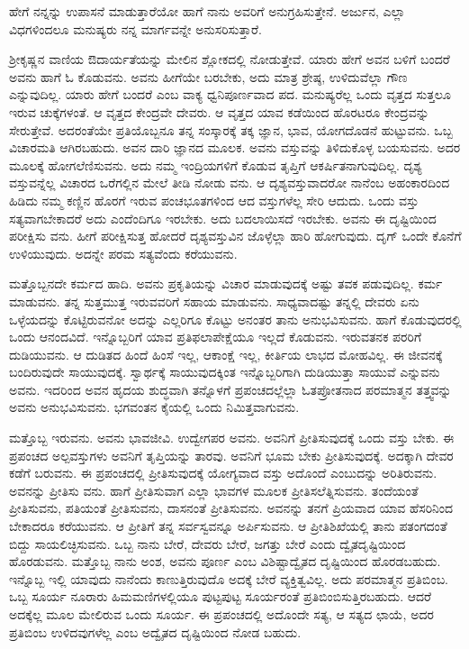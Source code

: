 {\small ಹೇಗೆ ನನ್ನನ್ನು ಉಪಾಸನೆ ಮಾಡುತ್ತಾರೆಯೋ ಹಾಗೆ ನಾನು ಅವರಿಗೆ ಅನುಗ್ರಹಿಸುತ್ತೇನೆ. ಅರ್ಜುನ, ಎಲ್ಲಾ ವಿಧಗಳಿಂದಲೂ ಮನುಷ್ಯರು ನನ್ನ ಮಾರ್ಗವನ್ನೇ ಅನುಸರಿಸುತ್ತಾರೆ.}

ಶ‍್ರೀಕೃಷ್ಣನ ವಾಣಿಯ ಔದಾರ್ಯತೆಯನ್ನು ಮೇಲಿನ ಶ್ಲೋಕದಲ್ಲಿ ನೋಡುತ್ತೇವೆ. ಯಾರು ಹೇಗೆ ಅವನ ಬಳಿಗೆ ಬಂದರೆ ಅವನು ಹಾಗೆ ಓ ಕೊಡುವನು. ಅವನು ಹೀಗೆಯೇ ಬರಬೇಕು, ಅದು ಮಾತ್ರ ಶ್ರೇಷ್ಠ, ಉಳಿದುವೆಲ್ಲಾ ಗೌಣ ಎನ್ನುವುದಿಲ್ಲ. ಯಾರು ಹೇಗೆ ಬಂದರೆ ಎಂಬ ವಾಕ್ಯ ಧ್ವನಿಪೂರ್ಣವಾದ ಪದ. ಮನುಷ್ಯರೆಲ್ಲ ಒಂದು ವೃತ್ತದ ಸುತ್ತಲೂ ಇರುವ ಚುಕ್ಕೆಗಳಂತೆ. ಆ ವೃತ್ತದ ಕೇಂದ್ರವೇ ದೇವರು. ಆ ವೃತ್ತದ ಯಾವ ಕಡೆಯಿಂದ ಹೊರಟರೂ ಕೇಂದ್ರವನ್ನು ಸೇರುತ್ತೇವೆ. ಅದರಂತೆಯೇ ಪ್ರತಿಯೊಬ್ಬನೂ ತನ್ನ ಸಂಸ್ಕಾರಕ್ಕೆ ತಕ್ಕ ಜ್ಞಾನ, ಭಾವ, ಯೋಗದೊಡನೆ ಹುಟ್ಟುವನು. ಒಬ್ಬ ವಿಚಾರಮತಿ ಆಗಿರಬಹುದು. ಅವನ ದಾರಿ ಜ್ಞಾನದ ಮೂಲಕ. ಅವನು ವಸ್ತುವನ್ನು ತಿಳಿದುಕೊಳ್ಳ ಬಯಸುವನು. ಅದರ ಮೂಲಕ್ಕೆ ಹೋಗಲೆಣಿಸುವನು. ಅದು ನಮ್ಮ ಇಂದ್ರಿಯಗಳಿಗೆ ಕೊಡುವ ತೃಪ್ತಿಗೆ ಆಕರ್ಷಿತನಾಗುವುದಿಲ್ಲ. ದೃಶ್ಯ ವಸ್ತುವನ್ನೆಲ್ಲ ವಿಚಾರದ ಒರೆಗಲ್ಲಿನ ಮೇಲೆ ತೀಡಿ ನೋಡು ವನು. ಆ ದೃಶ್ಯವಸ್ತುವಾದರೋ ನಾನೆಂಬ ಅಹಂಕಾರದಿಂದ ಹಿಡಿದು ನಮ್ಮ ಕಣ್ಣಿನ ಹೊರಗೆ ಇರುವ ಪಂಚಭೂತಗಳಿಂದ ಆದ ವಸ್ತುಗಳೆಲ್ಲ ಸೇರಿ ಆದುದು. ಒಂದು ವಸ್ತು ಸತ್ಯವಾಗಬೇಕಾದರೆ ಅದು ಎಂದೆಂದಿಗೂ ಇರಬೇಕು. ಅದು ಬದಲಾಯಿಸದೆ ಇರಬೇಕು. ಅವನು ಈ ದೃಷ್ಟಿಯಿಂದ ಪರೀಕ್ಷಿಸು ವನು. ಹೀಗೆ ಪರೀಕ್ಷಿಸುತ್ತ ಹೋದರೆ ದೃಶ್ಯವಸ್ತುವಿನ ಜೊಳ್ಳೆಲ್ಲಾ ಹಾರಿ ಹೋಗುವುದು. ದೃಗ್ ಒಂದೇ ಕೊನೆಗೆ ಉಳಿಯುವುದು. ಅದನ್ನೇ ಪರಮ ಸತ್ಯವೆಂದು ಕರೆಯುವನು.

ಮತ್ತೊಬ್ಬನದೇ ಕರ್ಮದ ಹಾದಿ. ಅವನು ಪ್ರಕೃತಿಯನ್ನು ವಿಚಾರ ಮಾಡುವುದಕ್ಕೆ ಅಷ್ಟು ತವಕ ಪಡುವುದಿಲ್ಲ. ಕರ್ಮ ಮಾಡುವನು. ತನ್ನ ಸುತ್ತಮುತ್ತ ಇರುವವರಿಗೆ ಸಹಾಯ ಮಾಡುವನು. ಸಾಧ್ಯವಾದಷ್ಟು ತನ್ನಲ್ಲಿ ದೇವರು ಏನು ಒಳ್ಳೆಯದನ್ನು ಕೊಟ್ಟಿರುವನೋ ಅದನ್ನು ಎಲ್ಲರಿಗೂ ಕೊಟ್ಟು ಅನಂತರ ತಾನು ಅನುಭವಿಸುವನು. ಹಾಗೆ ಕೊಡುವುದರಲ್ಲಿ ಒಂದು ಆನಂದವಿದೆ. ಇನ್ನೊಬ್ಬರಿಗೆ ಯಾವ ಪ್ರತಿಫಲಾಪೇಕ್ಷೆಯೂ ಇಲ್ಲದೆ ಕೊಡುವನು. ಇರುವತನಕ ಪರರಿಗೆ ದುಡಿಯುವನು. ಆ ದುಡಿತದ ಹಿಂದೆ ಹಿಂಸೆ ಇಲ್ಲ, ಆಕಾಂಕ್ಷೆ ಇಲ್ಲ, ಕೀರ್ತಿಯ ಲಾಭದ ಮೋಹವಿಲ್ಲ. ಈ ಜೀವನಕ್ಕೆ ಬಂದಿರುವುದೇ ಸಾಯುವುದಕ್ಕೆ. ಸ್ವಾರ್ಥಕ್ಕೆ ಸಾಯುವುದಕ್ಕಿಂತ ಇನ್ನೊಬ್ಬರಿಗಾಗಿ ದುಡಿಯುತ್ತಾ ಸಾಯುವೆ ಎನ್ನುವನು ಅವನು. ಇದರಿಂದ ಅವನ ಹೃದಯ ಶುದ್ಧವಾಗಿ ತನ್ನೊಳಗೆ ಪ್ರಪಂಚದಲ್ಲೆಲ್ಲಾ ಓತಪ್ರೋತನಾದ ಪರಮಾತ್ಮನ ತತ್ತ್ವವನ್ನು ಅವನು ಅನುಭವಿಸುವನು. ಭಗವಂತನ ಕೈಯಲ್ಲಿ ಒಂದು ನಿಮಿತ್ತವಾಗುವನು.

ಮತ್ತೊಬ್ಬ ಇರುವನು. ಅವನು ಭಾವಜೀವಿ. ಉದ್ವೇಗಪರ ಅವನು. ಅವನಿಗೆ ಪ್ರೀತಿಸುವುದಕ್ಕೆ ಒಂದು ವಸ್ತು ಬೇಕು. ಈ ಪ್ರಪಂಚದ ಅಲ್ಪವಸ್ತುಗಳು ಅವನಿಗೆ ತೃಪ್ತಿಯನ್ನು ತಾರವು. ಅವನಿಗೆ ಭೂಮ ಬೇಕು ಪ್ರೀತಿಸುವುದಕ್ಕೆ. ಅದಕ್ಕಾಗಿ ದೇವರ ಕಡೆಗೆ ಬರುವನು. ಈ ಪ್ರಪಂಚದಲ್ಲಿ ಪ್ರೀತಿಸುವುದಕ್ಕೆ ಯೋಗ್ಯವಾದ ವಸ್ತು ಅದೊಂದೆ ಎಂಬುದನ್ನು ಅರಿತಿರುವನು. ಅವನನ್ನು ಪ್ರೀತಿಸು ವನು. ಹಾಗೆ ಪ್ರೀತಿಸುವಾಗ ಎಲ್ಲಾ ಭಾವಗಳ ಮೂಲಕ ಪ್ರೀತಿಸಲೆತ್ನಿಸುವನು. ತಂದೆಯಂತೆ ಪ್ರೀತಿಸುವನು, ಪತಿಯಂತೆ ಪ್ರೀತಿಸುವನು, ದಾಸನಂತೆ ಪ್ರೀತಿಸುವನು. ಅವನನ್ನು ತನಗೆ ಪ್ರಿಯವಾದ ಯಾವ ಹೆಸರಿನಿಂದ ಬೇಕಾದರೂ ಕರೆಯುವನು. ಆ ಪ್ರೀತಿಗೆ ತನ್ನ ಸರ್ವಸ್ವವನ್ನೂ ಅರ್ಪಿಸುವನು. ಆ ಪ್ರೀತಿಶಿಖೆಯಲ್ಲಿ ತಾನು ಪತಂಗದಂತೆ ಬಿದ್ದು ಸಾಯಲಿಚ್ಛಿಸುವನು. ಒಬ್ಬ ನಾನು ಬೇರೆ, ದೇವರು ಬೇರೆ, ಜಗತ್ತು ಬೇರೆ ಎಂದು ದ್ವೈತದೃಷ್ಟಿಯಿಂದ ಹೊರಡುವನು. ಮತ್ತೊಬ್ಬ ನಾನು ಅಂಶ, ಅವನು ಪೂರ್ಣ ಎಂಬ ವಿಶಿಷ್ಟಾದ್ವೈತದ ದೃಷ್ಟಿಯಿಂದ ಹೊರಡಬಹುದು. ಇನ್ನೊಬ್ಬ ಇಲ್ಲಿ ಯಾವುದು ನಾನೆಂದು ಕಾಣುತ್ತಿರುವುದೊ ಅದಕ್ಕೆ ಬೇರೆ ವ್ಯಕ್ತಿತ್ವವಿಲ್ಲ. ಅದು ಪರಮಾತ್ಮನ ಪ್ರತಿಬಿಂಬ. ಒಬ್ಬ ಸೂರ್ಯ ನೂರಾರು ಹಿಮಮಣಿಗಳಲ್ಲಿಯೂ ಪುಟ್ಟಪುಟ್ಟ ಸೂರ್ಯರಂತೆ ಪ್ರತಿಬಿಂಬಿಸುತ್ತಿರಬಹುದು. ಆದರೆ ಅದಕ್ಕೆಲ್ಲ ಮೂಲ ಮೇಲಿರುವ ಒಂದು ಸೂರ್ಯ. ಈ ಪ್ರಪಂಚದಲ್ಲಿ ಅದೊಂದೇ ಸತ್ಯ, ಆ ಸತ್ಯದ ಛಾಯೆ, ಅದರ ಪ್ರತಿಬಿಂಬ ಉಳಿದವುಗಳೆಲ್ಲ ಎಂಬ ಅದ್ವೈತದ ದೃಷ್ಟಿಯಿಂದ ನೋಡ ಬಹುದು.

